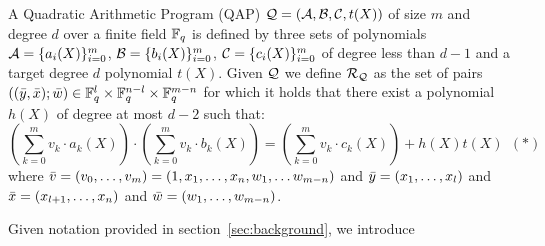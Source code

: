 \begin{definition}[QAP] 
\label{def:QAP}
A Quadratic Arithmetic Program (QAP) $\mathcal{Q} = (\mathcal{A}, \mathcal{B}, \mathcal{C}, t(X))$ of size $m$ 
and degree $d$ over a finite field $\mathbb{F}_q$ is defined by three sets of polynomials $\mathcal{A} = \{a_i(X)\}_{i=0}^m$, 
$\mathcal{B} = \{b_i(X)\}_{i=0}^m$, $\mathcal{C} = \{c_i(X)\}_{i=0}^m$ of degree less than $d-1$ and a target degree $d$ polynomial $t(X)$. Given 
$\mathcal{Q}$ we define $\mathcal{R}_{\mathcal{Q}}$ as the set of pairs $((\bar{y}, \bar{x}); \bar{w}) \in \mathbb{F}_q^{l} \times \mathbb{F}_q^{n-l} \times \mathbb{F}_q^{m-n}$ for which it 
holds that there exist a polynomial $h(X)$ of degree at most $d-2$ such that:
$$(\sum_{k=0}^m v_k \cdot a_k(X)) \cdot (\sum_{k=0}^m v_k \cdot b_k(X)) = (\sum_{k=0}^m v_k \cdot c_k(X)) + h(X)t(X) \ \ (\ast)$$ 
where $\bar{v} = (v_0, \ldots, v_m) = (1, x_1, \ldots, x_n, w_1, \ldots w_{m-n})$ and $\bar{y} = (x_1, \ldots, x_l)$ and 
$\bar{x} = (x_{l+1}, \ldots, x_n)$ and $\bar{w} = (w_1, \ldots, w_{m-n})$. 
\end{definition}

\noindent Given notation provided in section~\ref{sec:background}, we introduce

